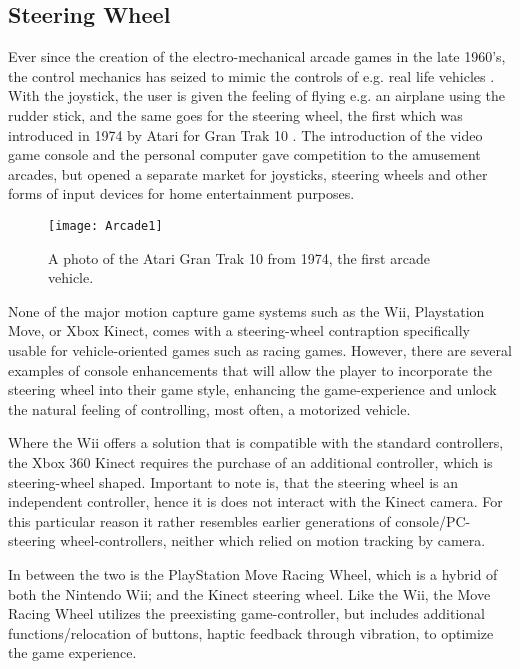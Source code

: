 \subsection{Steering Wheel}
Ever since the creation of the electro-mechanical arcade games in the late 1960's, the control mechanics has seized to mimic the controls of e.g. real life vehicles \parencite{Herz1997}. With the joystick, the user is given the feeling of flying e.g. an airplane using the rudder stick, and the same goes for the steering wheel, the first which was introduced in 1974 by Atari for Gran Trak 10 \parencite{Kohler2005}. The introduction of the video game console and the personal computer gave competition to the amusement arcades, but opened a separate market for joysticks, steering wheels and other forms of input devices for home entertainment purposes. 

\begin{figure}[!htbp] 
\centering
\texttt{[image: Arcade1]} 
\caption{A photo of the Atari Gran Trak 10 from 1974, the first arcade vehicle. }
\label{fig:Arcade}
\end{figure}
\bigskip

None of the major motion capture game systems such as the Wii, Playstation Move, or Xbox Kinect, comes with a steering-wheel contraption specifically usable for vehicle-oriented games such as racing games. However, there are several examples of console enhancements that will allow the player to incorporate the steering wheel into their game style, enhancing the game-experience and unlock the natural feeling of controlling, most often, a motorized vehicle.
\bigskip

Where the Wii offers a solution that is compatible with the standard controllers, the Xbox 360 Kinect requires the purchase of an additional controller, which is steering-wheel shaped. Important to note is, that the steering wheel is an independent controller, hence it is does not interact with the Kinect camera. For this particular reason it rather resembles earlier generations of console/PC-steering wheel-controllers, neither which relied on motion tracking by camera.
\bigskip

In between the two is the PlayStation Move Racing Wheel, which is a hybrid of both the Nintendo Wii; and the Kinect steering wheel. Like the Wii, the Move Racing Wheel utilizes the preexisting game-controller, but includes additional functions/relocation of buttons, haptic feedback through vibration, to optimize the game experience.

